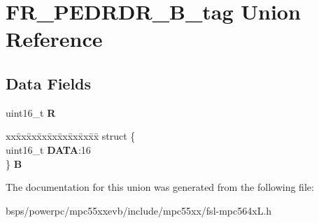 \hypertarget{unionFR__PEDRDR__16B__tag}{}\section{F\+R\+\_\+\+P\+E\+D\+R\+D\+R\+\_\+B\+\_\+tag Union Reference}
\label{unionFR__PEDRDR__16B__tag}
\subsection*{Data Fields}
\begin{DoxyCompactItemize}
\item 
\mbox{\label{unionFR__PEDRDR__16B__tag_abc0425333239211da84d2e27eb487739}} 
uint16\+\_\+t {\bfseries R}
\item 
\mbox{\label{unionFR__PEDRDR__16B__tag_a37063eaabd3e4baaca8447cd59736c0e}} 
\begin{tabbing}
xx\=xx\=xx\=xx\=xx\=xx\=xx\=xx\=xx\=\kill
struct \{\\
\>uint16\_t {\bfseries DATA}:16\\
\} {\bfseries B}\\

\end{tabbing}\end{DoxyCompactItemize}


The documentation for this union was generated from the following file\+:\begin{DoxyCompactItemize}
\item 
bsps/powerpc/mpc55xxevb/include/mpc55xx/fsl-\/mpc564x\+L.\+h\end{DoxyCompactItemize}
